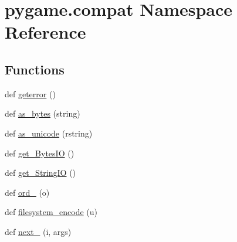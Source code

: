 \hypertarget{namespacepygame_1_1compat}{}\section{pygame.\+compat Namespace Reference}
\label{namespacepygame_1_1compat}
\subsection*{Functions}
\begin{DoxyCompactItemize}
\item 
def \hyperlink{namespacepygame_1_1compat_a38e2e705272fccb108c1ac326c3584b2}{geterror} ()
\item 
def \hyperlink{namespacepygame_1_1compat_a43db8b2f1d746ab728fda67afe4ed79e}{as\+\_\+bytes} (string)
\item 
def \hyperlink{namespacepygame_1_1compat_a967d563eb32bd2ba1c5d93031f099862}{as\+\_\+unicode} (rstring)
\item 
def \hyperlink{namespacepygame_1_1compat_a663170045656ae069ac9de787ef9bdce}{get\+\_\+\+Bytes\+IO} ()
\item 
def \hyperlink{namespacepygame_1_1compat_a5627d6320d8d59913dc98e77a5ceef9f}{get\+\_\+\+String\+IO} ()
\item 
def \hyperlink{namespacepygame_1_1compat_a4dc407cf288045deb5b1c2d80f3f8e75}{ord\+\_\+} (o)
\item 
def \hyperlink{namespacepygame_1_1compat_ae5e79f8485dad05b06633d04dee8f94e}{filesystem\+\_\+encode} (u)
\item 
def \hyperlink{namespacepygame_1_1compat_a46657c7da9b34bbc7cae525d35bb58a6}{next\+\_\+} (i, args)
\end{DoxyCompactItemize}
